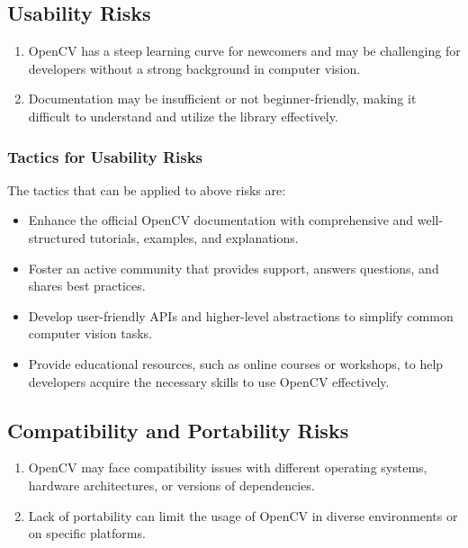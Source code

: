 \subsection{Usability Risks \label{subSection::UsabilityRisk}}
\begin{enumerate}
     \item OpenCV has a steep learning curve for newcomers and may be challenging for developers without a strong background in computer vision.
     \item Documentation may be insufficient or not beginner-friendly, making it difficult to understand and utilize the library effectively.   
 \end{enumerate}

 \subsubsection{Tactics for Usability Risks \label{subsubSection::UsabilityTactic}}
The tactics that can be applied to above risks are:
\begin{itemize}
    \item Enhance the official OpenCV documentation with comprehensive and well-structured tutorials, examples, and explanations.
    \item Foster an active community that provides support, answers questions, and shares best practices.
    \item Develop user-friendly APIs and higher-level abstractions to simplify common computer vision tasks.
    \item Provide educational resources, such as online courses or workshops, to help developers acquire the necessary skills to use OpenCV effectively.
\end{itemize}
  
\subsection{Compatibility and Portability Risks \label{subSection::CompatibilityRisk}}
\begin{enumerate}
     \item OpenCV may face compatibility issues with different operating systems, hardware architectures, or versions of dependencies.
     \item Lack of portability can limit the usage of OpenCV in diverse environments or on specific platforms.  
 \end{enumerate}

